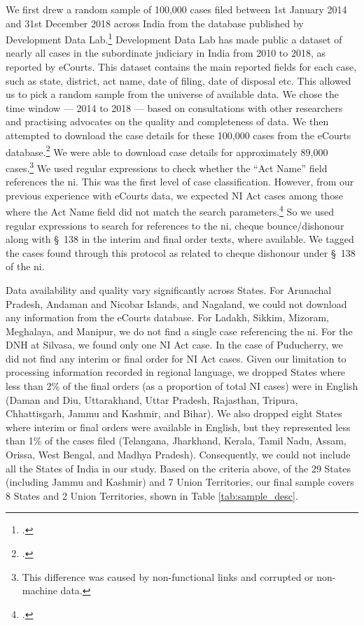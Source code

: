 \documentclass[12pt,a4paper]{article}
\begin{document}
We first drew a random sample of 100,000 cases filed between 1st January 2014 and 31st December 2018 across India from the database published by Development Data Lab.\footcite{devdatalabs2021_eCourtsData} Development Data Lab has made public a dataset of nearly all cases in the subordinate judiciary in India from 2010 to 2018, as reported by eCourts. This dataset contains the main reported fields for each case, such as state, district, act name, date of filing, date of disposal etc. This allowed us to pick a random sample from the universe of available data. We chose the time window --- 2014 to 2018 --- based on consultations with other researchers and practising advocates on the quality and completeness of data. We then attempted to download the case details for these 100,000 cases from the eCourts database.\footcite{ecourts2022} We were able to download case details for approximately 89,000 cases.\footnote{This difference was caused by non-functional links and corrupted or non-machine data.} We used regular expressions to check whether the ``Act Name'' field references the \gls{ni}. This was the first level of case classification. However, from our previous experience with eCourts data, we expected NI Act cases among those where the Act Name field did not match the search parameters.\footcite[The Act Name field sometimes does not contain the name of the substantive Act but rather the name of the procedural Act (e.g., CrPC) or, in rare cases, the subject matter of the case. This is mainly because case classification and nomenclature practices vary from State to State. However, in rare cases, the field is not populated or contains erroneous information. For details, please see,][]{damle2020_ecourtsData} So we used regular expressions to search for references to the \gls{ni}, cheque bounce/dishonour along with \S~138 in the interim and final order texts, where available. We tagged the cases found through this protocol as related to cheque dishonour under \S~138 of the \gls{ni}.

Data availability and quality vary significantly across States. For Arunachal Pradesh, Andaman and Nicobar Islands, and Nagaland, we could not download any information from the eCourts database. For Ladakh, Sikkim, Mizoram, Meghalaya, and Manipur, we do not find a single case referencing the \gls{ni}. For the DNH at Silvasa, we found only one NI Act case. In the case of Puducherry, we did not find any interim or final order for NI Act cases. Given our limitation to processing information recorded in regional language, we dropped States where less than 2\% of the final orders (as a proportion of total NI cases) were in English (Daman and Diu, Uttarakhand, Uttar Pradesh, Rajasthan, Tripura, Chhattisgarh, Jammu and Kashmir, and Bihar). We also dropped eight States where interim or final orders were available in English, but they represented less than 1\% of the cases filed (Telangana, Jharkhand, Kerala, Tamil Nadu, Assam, Orissa, West Bengal, and Madhya Pradesh). Consequently, we could not include all the States of India in our study. Based on the criteria above, of the 29 States (including Jammu and Kashmir) and 7 Union Territories, our final sample covers 8 States and 2 Union Territories, shown in Table \ref{tab:sample_desc}.
\end{document}
